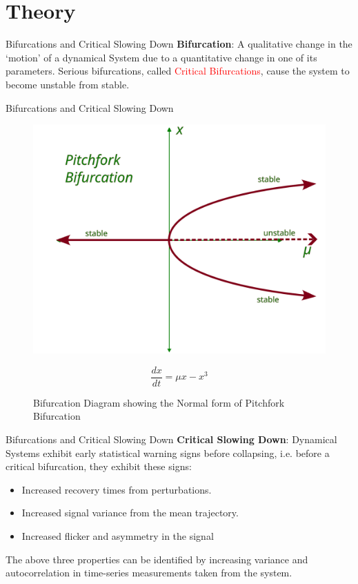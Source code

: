 \section[Theory]{Theory}
\label{sec:theory}

\begin{frame}{Bifurcations and Critical Slowing Down}
	\textbf{Bifurcation}: A qualitative change in the `motion' of a dynamical System due to a quantitative change in one of its parameters. Serious bifurcations, called \textcolor{red}{Critical Bifurcations}, cause the system to become unstable from stable.
\end{frame}

\begin{frame}{Bifurcations and Critical Slowing Down}
	\begin{figure}
		\centering
		\includegraphics[scale=0.15]{../figures/bftrans1.png}
		\label{fig:transcritBifurcation}
		\caption{Bifurcation Diagram showing the Normal form of Pitchfork Bifurcation}
		\begin{equation}
			\frac{dx}{dt} = \mu x - x^3
		\end{equation}
	\end{figure}
\end{frame}

\begin{frame}{Bifurcations and Critical Slowing Down}
	\textbf{Critical Slowing Down}: Dynamical Systems exhibit early statistical warning signs before collapsing, i.e. before a critical bifurcation, they exhibit these signs:
	\begin{itemize}
		\item Increased recovery times from perturbations.
		\item Increased signal variance from the mean trajectory.
		\item Increased flicker and asymmetry in the signal
	\end{itemize}
	The above three properties can be identified by increasing variance and autocorrelation in time-series measurements taken from the system.
\end{frame}

